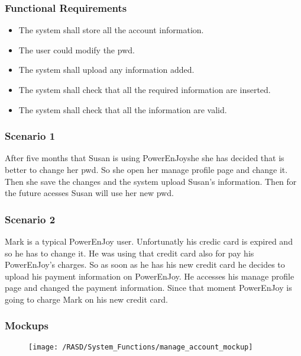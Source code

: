 \subsubsection{Functional Requirements}
\begin{itemize}
  \item The system shall store all the account information.
  \item The user could modify the \gls{pwd}.
  \item The system shall upload any information added.
  \item The system shall check that all the required information are inserted.
  \item The system shall check that all the information are valid.
\end{itemize}

\subsubsection{Scenario 1}
After five months that Susan is using PowerEnJoyshe she has decided that is better to change her \gls{pwd}. So she open her manage profile page and change it. Then she save the changes and the system upload Susan's information. Then for the future acesses Susan will use her new \gls{pwd}.

\subsubsection{Scenario 2}
Mark is a typical PowerEnJoy user. Unfortunatly his credic card is expired and so he has to change it. He was using that credit card also for pay his PowerEnJoy's charges. So as soon as he has his new credit card he decides to upload his payment information on PowerEnJoy. He accesses his manage profile page and changed the payment information. Since that moment PowerEnJoy is going to charge Mark on his new credit card.



\subsubsection{Mockups}
\begin{figure}[!ht]
  \centering
  \vspace{0.2cm}
  \texttt{[image: /RASD/System\_Functions/manage\_account\_mockup]}\\
  \vspace{0.4cm}
  \label{fig:manage_account_mockup} 
\end{figure}



